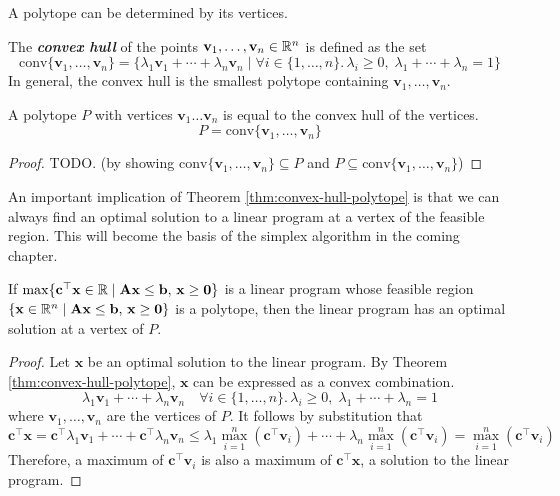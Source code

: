 A polytope can be determined by its vertices.

\begin{definition} 
    The \textit{\textbf{convex hull}} of the points $\mathbf{v}_1,\ldots,\mathbf{v}_n \in \mathbb{R}^n$ is defined as the set
    $$
    \mathrm{conv} \{\mathbf{v}_1,\ldots,\mathbf{v}_n\} = \{ \lambda_1 \mathbf{v}_1 + \cdots + \lambda_n \mathbf{v}_n \mid \forall i \in \{1,\ldots,n\}.\, \lambda_i \geq 0,\; \lambda_1+\cdots+\lambda_n = 1 \}
    $$
    In general, the convex hull is the smallest polytope containing $\mathbf{v}_1,\ldots,\mathbf{v}_n$.
\end{definition}

\begin{theorem} \label{thm:convex-hull-polytope}
    A polytope $P$ with vertices $\mathbf{v}_1 \ldots \mathbf{v}_n$ is equal to the convex hull of the vertices.
    $$
    P = \mathrm{conv} \{\mathbf{v}_1,\ldots,\mathbf{v}_n\}
    $$
\end{theorem}

\begin{proof}
    TODO. (by showing $\mathrm{conv} \{\mathbf{v}_1,\ldots,\mathbf{v}_n\} \subseteq P$ and $P \subseteq \mathrm{conv} \{\mathbf{v}_1,\ldots,\mathbf{v}_n\}$)
\end{proof}

An important implication of Theorem \ref{thm:convex-hull-polytope} is that we can always find an optimal solution to a linear program at a vertex of the feasible region. This will become the basis of the simplex algorithm in the coming chapter.

\begin{theorem}
    If $\max \{ \mathbf{c}^\top \mathbf{x} \in \mathbb{R} \mid \mathbf{A}\mathbf{x} \leq \mathbf{b},\, \mathbf{x} \geq \textbf{0} \}$ is a linear program whose feasible region $\{ \mathbf{x} \in \mathbb{R}^n \mid \mathbf{A}\mathbf{x} \leq \mathbf{b},\, \mathbf{x} \geq \textbf{0} \}$ is a polytope, then the linear program has an optimal solution at a vertex of $P$.
\end{theorem}

\begin{proof}
    Let $\mathbf{x}$ be an optimal solution to the linear program. By Theorem \ref{thm:convex-hull-polytope}, $\mathbf{x}$ can be expressed as a convex combination.
    $$
    \lambda_1 \mathbf{v}_1 + \cdots + \lambda_n \mathbf{v}_n \quad \forall i \in \{1,\ldots,n\}.\, \lambda_i \geq 0,\; \lambda_1+\cdots+\lambda_n = 1
    $$
    where $\mathbf{v}_1,\ldots,\mathbf{v}_n$ are the vertices of $P$. It follows by substitution that
    $$
    \mathbf{c}^\top \mathbf{x} = \mathbf{c}^\top \lambda_1 \mathbf{v}_1 + \cdots + \mathbf{c}^\top \lambda_n \mathbf{v}_n \leq  \lambda_1 \max_{i=1}^n (\mathbf{c}^\top \mathbf{v}_i) + \cdots + \lambda_n \max_{i=1}^n (\mathbf{c}^\top \mathbf{v}_i) = \max_{i=1}^n (\mathbf{c}^\top \mathbf{v}_i)
    $$
    Therefore, a maximum of $\mathbf{c}^\top \mathbf{v}_i$ is also a maximum of $\mathbf{c}^\top \mathbf{x}$, a solution to the linear program.
\end{proof}